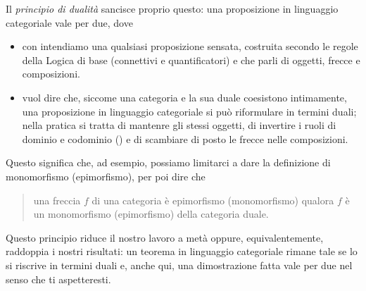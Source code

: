 Il {\em principio di dualità} sancisce proprio questo: una proposizione in linguaggio categoriale vale per due, dove
%
\begin{itemize}
\item con  intendiamo una qualsiasi proposizione sensata, costruita secondo le regole della Logica di base (connettivi e quantificatori) e che parli di oggetti, frecce e composizioni.
\item {} vuol dire che, siccome una categoria e la sua duale coesistono intimamente, una proposizione in linguaggio categoriale si può riformulare in termini duali; nella pratica si tratta di mantenre gli stessi oggetti, di invertire i ruoli di dominio e codominio () e di scambiare di posto le frecce nelle composizioni.
\end{itemize}

Questo significa che, ad esempio, possiamo limitarci a dare la definizione di monomorfismo (epimorfismo), per poi dire che
\begin{quotation}
una freccia \(f\) di una categoria è epimorfismo (monomorfismo) qualora \(f\) è un monomorfismo (epimorfismo) della categoria duale.
\end{quotation}

Questo principio riduce il nostro lavoro a metà oppure, equivalentemente, raddoppia i nostri risultati: un teorema in linguaggio categoriale rimane tale se lo si riscrive in termini duali e, anche qui, una dimostrazione fatta vale per due nel senso che ti aspetteresti.
